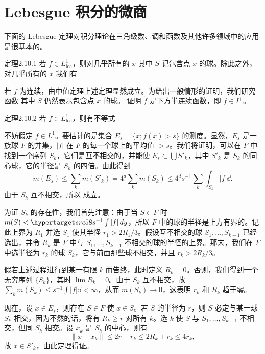\section{Lebesgue 积分的微商}
下面的 Lebesgue 定理对积分理论在三角级数、调和函数及其他许多领域中的应用是很基本的。
\begin{statement}{定理}{2.10.1}
若 $f\in L^1_{\mathrm{loc}}$，则对几乎所有的 $x$
其中 $S$ 记包含点 $x$ 的球。除此之外，对几乎所有的 $x$ 我们有
\end{statement}
若 $f$ 为连续，由中值定理上述定理显然成立。为给出一般情形的证明，我们研究函数
其中 $S$ 仍然表示包含点 $x$ 的球。
\Exercise 证明 $\widetilde f$ 是下方半连续函数，即 $\widetilde f\in I^+$。
\begin{statement}{定理}{2.10.2}
若 $f\in L^1_{\mathrm{loc}}$，则有不等式
\end{statement}
\Proof 不妨假定 $f\in L^1$。要估计的是集合 $E_s=\{x;\widetilde f(x)>s\}$ 的测度。显然，$E_s$ 是一族球 $F$ 的并集，$|f|$ 在 $F$ 的每一个球上的平均值 $>s$。我们将证明，可以在 $F$ 中找到一个序列 $S_k$，它们是互不相交的，并能使 $E_s\subset\bigcup S'_k$，其中 $S'_k$ 是 $S_k$ 的同心球，它的半径是 $S_k$ 的四倍。由此得到
\[m(E_s)\le\sum_km(S'_k)=4^d\sum_km(S_k)\le4^ds^{-1}\sum_k\int_{S_k}|f|\dd.\]
由于 $S_k$ 互不相交，所以  成立。

为证 $S_k$ 的存在性，我们首先注意：由于当 $S\in F$ 时 $m(S)<
\SourcePage{58}
 s^{-1}\int|f|\,dy$，所以 $F$ 中的球的半径是上方有界的。记此上界为 $R_1$ 并选 $S_1$ 使其半径 $r_1>2R_1/3$。假设互不相交的球 $S_1,\ldots,S_{k-1}$ 已经选出，并令 $R_k$ 是 $F$ 中与 $S_1,\ldots,S_{k-1}$ 不相交的球的半径的上界。那末，我们在 $F$ 中选半径为 $r_k$ 的球 $S_k$，它与前面那些球不相交，并且 $r_k>2R_k/3$。

假若上述过程进行到某一有限 $k$ 而告终，此时定义 $R_k=0$。否则，我们得到一个无穷序列 $\{S_k\}$，其时 $\lim R_k=0$。由于 $S_k$ 互不相交，故 $\sum_km(S_k)\le s^{-1}\int|f|\dd<\infty$，从而 $m(S_k)\to0$，这表明 $r_k$ 和 $R_k$ 趋于零。

现在，设 $x\in E_s$，则存在 $S\in F$ 使 $x\in S$。若 $S$ 的半径为 $r$，则 $S$ 必定与某一球 $S_k$ 相交，因为不然的话，将有 $R_k\ge r$ 对所有 $k$。选 $k$ 使 $S$ 与 $S_1,\ldots,S_{k-1}$ 不相交，但同 $S_k$ 相交。设 $x_k$ 是 $S_k$ 的中心，则有
\[\|x-x_k\|\le2r+r_k\le2R_k+r_k\le4r_k,\]
故 $x\in S'_k$，由此定理得证。

